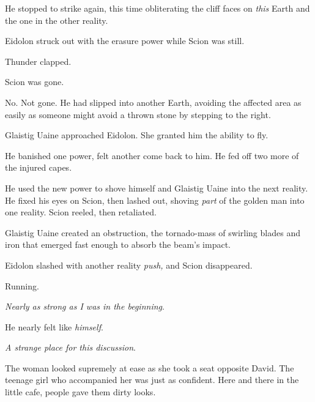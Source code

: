 He stopped to strike again, this time obliterating the cliff faces on \emph{this} Earth and the one in the other reality.



Eidolon struck out with the erasure power while Scion was still.



Thunder clapped.



Scion was gone.



No.  Not gone.  He had slipped into another Earth, avoiding the affected area as easily as someone might avoid a thrown stone by stepping to the right.



Glaistig Uaine approached Eidolon.  She granted him the ability to fly.



He banished one power, felt another come back to him.  He fed off two more of the injured capes.



He used the new power to shove himself and Glaistig Uaine into the next reality.  He fixed his eyes on Scion, then lashed out, shoving \emph{part} of the golden man into one reality.  Scion reeled, then retaliated.



Glaistig Uaine created an obstruction, the tornado-mass of swirling blades and iron that emerged fast enough to absorb the beam's impact.



Eidolon slashed with another reality \emph{push, }and Scion disappeared.



Running.



\emph{Nearly as strong as I was in the beginning}.



He nearly felt like \emph{himself}.



\blacksquare






\emph{A strange place for this discussion}.



The woman looked supremely at ease as she took a seat opposite David.  The teenage girl who accompanied her was just as confident.  Here and there in the little cafe, people gave them dirty looks.




